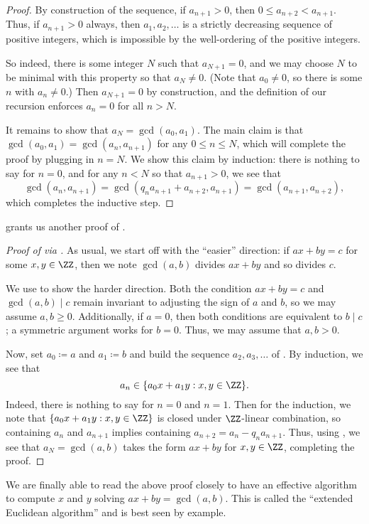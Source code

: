 \documentclass[../notes.tex]{subfiles}
\begin{document}
\begin{proof}
	By construction of the sequence, if $a_{n+1}>0$, then $0\le a_{n+2}<a_{n+1}$. Thus, if $a_{n+1}>0$ always, then $a_1,a_2,\ldots$ is a strictly decreasing sequence of positive integers, which is impossible by the well-ordering of the positive integers.
	
	So indeed, there is some integer $N$ such that $a_{N+1}=0$, and we may choose $N$ to be minimal with this property so that $a_N\ne0$. (Note that $a_0\ne0$, so there is some $n$ with $a_n\ne0$.) Then $a_{N+1}=0$ by construction, and the definition of our recursion enforces $a_n=0$ for all $n>N$.

	It remains to show that $a_N=\gcd(a_0,a_1)$. The main claim is that $\gcd(a_0,a_1)=\gcd(a_n,a_{n+1})$ for any $0\le n\le N$, which will complete the proof by plugging in $n=N$. We show this claim by induction: there is nothing to say for $n=0$, and for any $n<N$ so that $a_{n+1}>0$, we see that
	\[\gcd(a_n,a_{n+1})=\gcd(q_na_{n+1}+a_{n+2},a_{n+1})=\gcd(a_{n+1},a_{n+2}),\]
	which completes the inductive step.
\end{proof}
 grants us another proof of .
\begin{proof}[Proof of  via ]
	As usual, we start off with the ``easier'' direction: if $ax+by=c$ for some $x,y\in\ZZ$, then we note $\gcd(a,b)$ divides $ax+by$ and so divides $c$.

	We use  to show the harder direction. Both the condition $ax+by=c$ and $\gcd(a,b)\mid c$ remain invariant to adjusting the sign of $a$ and $b$, so we may assume $a,b\ge0$. Additionally, if $a=0$, then both conditions are equivalent to $b\mid c$; a symmetric argument works for $b=0$. Thus, we may assume that $a,b>0$.

	Now, set $a_0\coloneqq a$ and $a_1\coloneqq b$ and build the sequence $a_2,a_3,\ldots$ of . By induction, we see that
	\[a_n\in\{a_0x+a_1y:x,y\in\ZZ\}.\]
	Indeed, there is nothing to say for $n=0$ and $n=1$. Then for the induction, we note that $\{a_0x+a_1y:x,y\in\ZZ\}$ is closed under $\ZZ$-linear combination, so containing $a_n$ and $a_{n+1}$ implies containing $a_{n+2}=a_n-q_na_{n+1}$. Thus, using , we see that $a_N=\gcd(a,b)$ takes the form $ax+by$ for $x,y\in\ZZ$, completing the proof.
\end{proof}
We are finally able to read the above proof closely to have an effective algorithm to compute $x$ and $y$ solving $ax+by=\gcd(a,b)$. This is called the ``extended Euclidean algorithm'' and is best seen by example.
\end{document}
